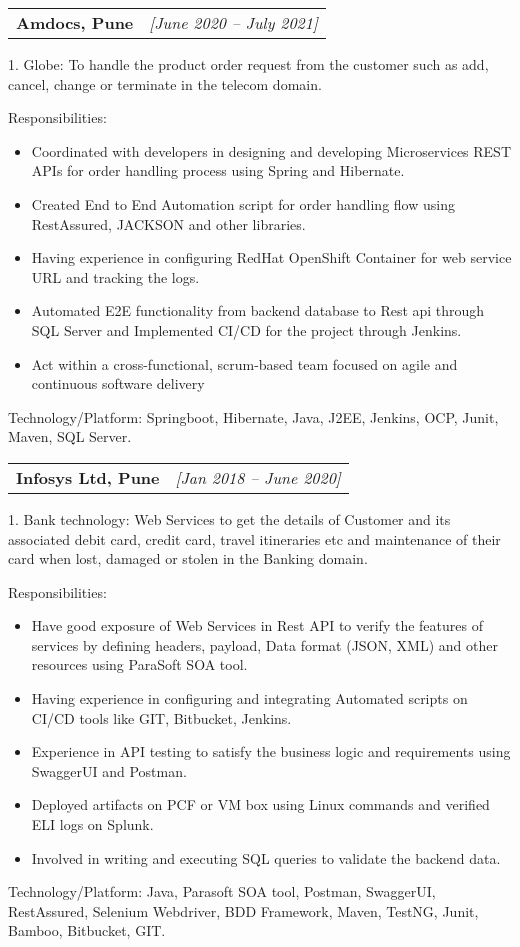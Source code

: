 \documentclass[a4paper,10pt]{article}
\makeatletter
\newcommand{\resitem}[1]{\item #1}
\newcommand{\ressubheading}[3]{\begin{tabular*}{6.62in}{l @{\extracolsep{\fill}} r} \textbf{#1} & \textit{[#2]} \\ \end{tabular*}\vspace{-8pt}}
\makeatother
\begin{document}
\ressubheading{Amdocs, Pune}{June 2020 – July 2021}{Software Engineer}
\resitem{1. Globe:} To handle the product order request from the customer such as add, cancel, change or terminate in the telecom domain.
\resitem{Responsibilities:}
\begin{itemize}[nosep]
    \item Coordinated with developers in designing and developing Microservices REST APIs for order handling process using Spring and Hibernate.
    \item Created End to End Automation script for order handling flow using RestAssured, JACKSON and other libraries.
    \item Having experience in configuring RedHat OpenShift Container for web service URL and tracking the logs.
    \item Automated E2E functionality from backend database to Rest api through SQL Server and Implemented CI/CD for the project through Jenkins.
    \item Act within a cross-functional, scrum-based team focused on agile and continuous software delivery
\end{itemize}
Technology/Platform: Springboot, Hibernate, Java, J2EE, Jenkins, OCP, Junit, Maven, SQL Server.

\ressubheading{Infosys Ltd, Pune}{Jan 2018 – June 2020}{System Engineer}
\resitem{1. Bank technology:} Web Services to get the details of Customer and its associated debit card, credit card, travel itineraries etc and maintenance of their card when lost, damaged or stolen in the Banking domain.
\resitem{Responsibilities:}
\begin{itemize}[nosep]
    \item Have good exposure of Web Services in Rest API to verify the features of services by defining headers, payload, Data format (JSON, XML) and other resources using ParaSoft SOA tool.
    \item Having experience in configuring and integrating Automated scripts on CI/CD tools like GIT, Bitbucket, Jenkins.
    \item Experience in API testing to satisfy the business logic and requirements using SwaggerUI and Postman.
    \item Deployed artifacts on PCF or VM box using Linux commands and verified ELI logs on Splunk.
    \item Involved in writing and executing SQL queries to validate the backend data.
\end{itemize}
Technology/Platform: Java, Parasoft SOA tool, Postman, SwaggerUI, RestAssured, Selenium Webdriver, BDD Framework, Maven, TestNG, Junit, Bamboo, Bitbucket, GIT.
\end{document}
